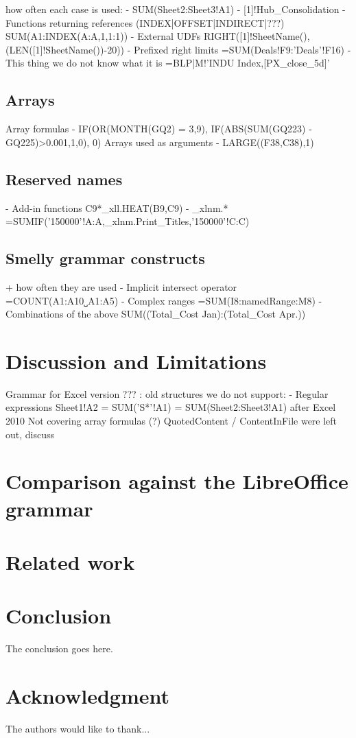 \documentclass[conference]{IEEEtran}
\begin{document}
how often each case is used:
- SUM(Sheet2:Sheet3!A1)
- [1]!Hub\_Consolidation
- Functions returning references (INDEX|OFFSET|INDIRECT|???) SUM(A1:INDEX(A:A,1,1:1))
- External UDFs RIGHT([1]!SheetName(),(LEN([1]!SheetName())-20))
- Prefixed right limits =SUM(Deals!F9:'Deals'!F16)
- This thing we do not know what it is =BLP|M!'INDU Index,[PX\_close\_5d]'

\subsection{Arrays}
Array formulas
- IF(OR(MONTH(GQ2) = {3,9}), IF(ABS(SUM(GQ223) - GQ225)>0.001,1,0), 0)
Arrays used as arguments
- LARGE((F38,C38),1)

\subsection{Reserved names}
- Add-in functions C9*\_xll.HEAT(B9,C9)
- \_xlnm.* =SUMIF('150000'!A:A,\_xlnm.Print\_Titles,'150000'!C:C)


\subsection{Smelly grammar constructs}
 + how often they are used
- Implicit intersect operator =COUNT(A1:A10˽A1:A5)
- Complex ranges =SUM(I8:namedRange:M8)
- Combinations of the above SUM((Total\_Cost Jan):(Total\_Cost Apr.))

\section{Discussion and Limitations}
Grammar for Excel version ??? : old structures we do not support:
- Regular expressions Sheet1!A2 = SUM('S*'!A1) = SUM(Sheet2:Sheet3!A1) after Excel 2010
Not covering array formulas (?)
QuotedContent / ContentInFile were left out, discuss

\section{Comparison against the LibreOffice grammar}

\section{Related work}

\section{Conclusion}
The conclusion goes here.


\section*{Acknowledgment}
The authors would like to thank...




\end{document}
